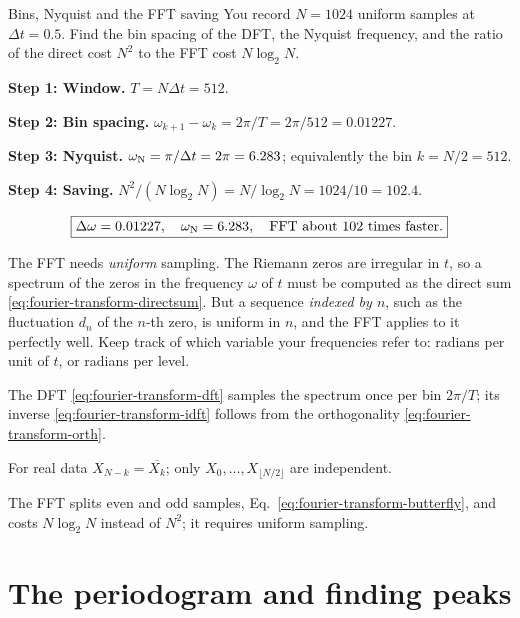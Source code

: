 \begin{sample}{Bins, Nyquist and the FFT saving}
You record $N=1024$ uniform samples at $\Delta t=0.5$. Find the bin spacing of the DFT, the Nyquist frequency, and the ratio of the direct cost $N^2$ to the FFT cost $N\log_2N$.

\textbf{Step 1: Window.} $T=N\Delta t=512$.

\textbf{Step 2: Bin spacing.} $\omega_{k+1}-\omega_k=2\pi/T=2\pi/512=0.01227$.

\textbf{Step 3: Nyquist.} $\omega_{\rm N}=\pi/\Delta t=2\pi=6.283$; equivalently the bin $k=N/2=512$.

\textbf{Step 4: Saving.} $N^2/(N\log_2N)=N/\log_2N=1024/10=102.4$.

\[\boxed{\Delta\omega=0.01227,\quad\omega_{\rm N}=6.283,\quad\text{FFT about }102\text{ times faster}.}\]
\end{sample}

\begin{pitfall}
The FFT needs \emph{uniform} sampling. The Riemann zeros are irregular in $t$, so a spectrum of the zeros in the frequency $\omega$ of $t$ must be computed as the direct sum \eqref{eq:fourier-transform-directsum}. But a sequence \emph{indexed by $n$}, such as the fluctuation $d_n$ of the $n$-th zero, is uniform in $n$, and the FFT applies to it perfectly well. Keep track of which variable your frequencies refer to: radians per unit of $t$, or radians per level.
\end{pitfall}

\begin{keyideas}

\item The DFT \eqref{eq:fourier-transform-dft} samples the spectrum once per bin $2\pi/T$; its inverse \eqref{eq:fourier-transform-idft} follows from the orthogonality \eqref{eq:fourier-transform-orth}.
\item For real data $X_{N-k}=\overline{X_k}$; only $X_0,\dots,X_{\lfloor N/2\rfloor}$ are independent.
\item The FFT splits even and odd samples, Eq.~\eqref{eq:fourier-transform-butterfly}, and costs $N\log_2N$ instead of $N^2$; it requires uniform sampling.

\end{keyideas}

\section{The periodogram and finding peaks}\label{sec:fourier-transform-periodogram}

